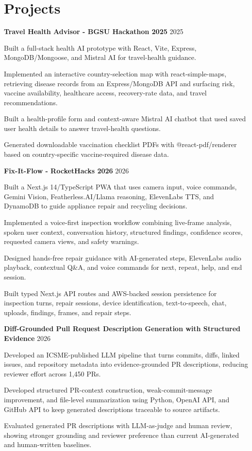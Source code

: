 \documentclass[letterpaper,10pt]{article}
\newcommand{\projectHeading}[2]{
  \vspace{2pt}
  \textbf{#1} \hfill #2
}
\begin{document}
\section{Projects}
\projectHeading{Travel Health Advisor - BGSU Hackathon 2025}{2025}
\begin{tightitemize}
  \item Built a full-stack health AI prototype with React, Vite, Express, MongoDB/Mongoose, and Mistral AI for travel-health guidance.
  \item Implemented an interactive country-selection map with react-simple-maps, retrieving disease records from an Express/MongoDB API and surfacing risk, vaccine availability, healthcare access, recovery-rate data, and travel recommendations.
  \item Built a health-profile form and context-aware Mistral AI chatbot that used saved user health details to answer travel-health questions.
  \item Generated downloadable vaccination checklist PDFs with @react-pdf/renderer based on country-specific vaccine-required disease data.
\end{tightitemize}

\projectHeading{Fix-It-Flow - RocketHacks 2026}{2026}
\begin{tightitemize}
  \item Built a Next.js 14/TypeScript PWA that uses camera input, voice commands, Gemini Vision, Featherless.AI/Llama reasoning, ElevenLabs TTS, and DynamoDB to guide appliance repair and recycling decisions.
  \item Implemented a voice-first inspection workflow combining live-frame analysis, spoken user context, conversation history, structured findings, confidence scores, requested camera views, and safety warnings.
  \item Designed hands-free repair guidance with AI-generated steps, ElevenLabs audio playback, contextual Q\&A, and voice commands for next, repeat, help, and end session.
  \item Built typed Next.js API routes and AWS-backed session persistence for inspection turns, repair sessions, device identification, text-to-speech, chat, uploads, findings, frames, and repair steps.
\end{tightitemize}

\projectHeading{Diff-Grounded Pull Request Description Generation with Structured Evidence}{2026}
\begin{tightitemize}
  \item Developed an ICSME-published LLM pipeline that turns commits, diffs, linked issues, and repository metadata into evidence-grounded PR descriptions, reducing reviewer effort across 1,450 PRs.
  \item Developed structured PR-context construction, weak-commit-message improvement, and file-level summarization using Python, OpenAI API, and GitHub API to keep generated descriptions traceable to source artifacts.
  \item Evaluated generated PR descriptions with LLM-as-judge and human review, showing stronger grounding and reviewer preference than current AI-generated and human-written baselines.
\end{tightitemize}
\end{document}
